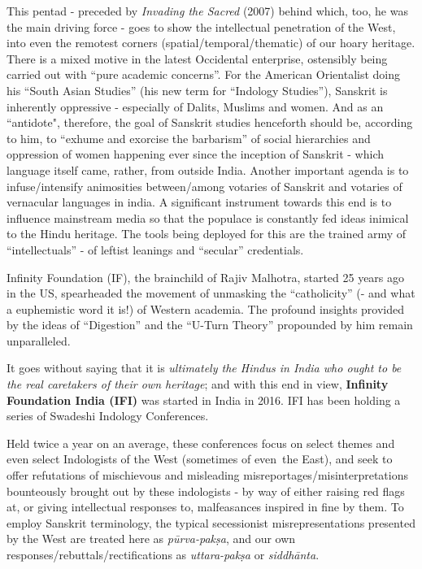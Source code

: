 This pentad - preceded by {\sl Invading the Sacred} (2007) behind which, too, he was the main driving force - goes to show the intellectual penetration of the West, into even the remotest corners (spatial/temporal/\break thematic) of our hoary heritage. There is a mixed motive in the latest Occidental enterprise,  ostensibly being carried out with “pure academic concerns”. For the American Orientalist doing his ``South Asian Studies'' (his new term for “Indology Studies”), Sanskrit is inherently oppressive - especially of Dalits, Muslims and women. And as an ``antidote", therefore, the goal of Sanskrit studies henceforth should be, according to him, to ``exhume and exorcise the barbarism'' of social hierarchies and oppression of women happening ever since the inception of Sanskrit - which language itself came, rather, from outside India. Another important agenda is to infuse/intensify animosities between/among votaries of Sanskrit and votaries of vernacular languages in india. A significant instrument towards this end is to influence mainstream media so that the populace is constantly fed ideas inimical to the Hindu heritage. The tools being deployed for this are the trained army of “intellectuals” - of leftist leanings and “secular” credentials.
\vskip 1.5pt

Infinity Foundation (IF), the brainchild of Rajiv Malhotra, started 25 years ago in the US, spearheaded the movement of unmasking the “catholicity” (- and what a euphemistic word it is!) of Western academia. The profound insights provided by the ideas of ``Digestion'' and the “U-Turn Theory” propounded by him remain unparalleled.
\vskip 1.5pt

It goes without saying that it is {\sl ultimately the Hindus in India who ought to be the real caretakers of their own heritage}; and with this end in view, {\bf Infinity Foundation India (IFI)} was started in India in 2016. IFI has been holding a series of Swadeshi Indology Conferences. 
\vskip 1.5pt

Held twice a year on an average, these conferences focus on select themes and even select Indologists of the West (sometimes of even~the East), and seek to offer refutations of mischievous  and misleading misreportages/misinterpretations bounteously brought out by these indologists - by way of either raising red flags at, or giving intellectual responses to, malfeasances inspired in fine by them. To employ Sanskrit terminology, the typical secessionist misrepresentations presented by the West are treated here as {\sl pūrva-pakṣa}, and our own responses/rebuttals/rectifications as {\sl uttara-pakṣa} or {\sl siddhānta}. 

